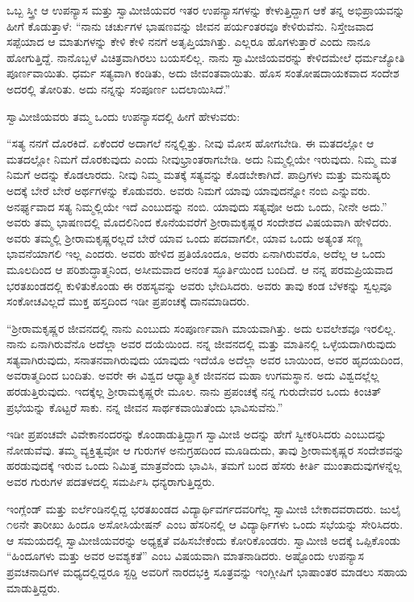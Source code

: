  ಒಬ್ಬ ಸ್ತ್ರೀ ಆ ಉಪನ್ಯಾಸ ಮತ್ತು ಸ್ವಾಮೀಜಿಯವರ ಇತರ ಉಪನ್ಯಾಸಗಳನ್ನು ಕೇಳುತ್ತಿದ್ದಾಗ ಆಕೆ ತನ್ನ ಅಭಿಪ್ರಾಯವನ್ನು ಹೀಗೆ ಕೊಡುತ್ತಾಳೆ: “ನಾನು ಚರ್ಚುಗಳ ಭಾಷಣವನ್ನು ಜೀವನ ಪರ್ಯಂತರವೂ ಕೇಳಿರುವೆನು. ನಿಸ್ತೇಜವಾದ ಸಪ್ಪೆಯಾದ ಆ ಮಾತುಗಳನ್ನು ಕೇಳಿ ಕೇಳಿ ನನಗೆ ಅತೃಪ್ತಿಯಾಗಿತ್ತು. ಎಲ್ಲರೂ ಹೊಗಳುತ್ತಾರೆ ಎಂದು ನಾನೂ ಹೋಗುತ್ತಿದ್ದೆ. ನಾನೊಬ್ಬಳೆ ವಿಚಿತ್ರವಾಗಿರಲು ಬಯಸಲಿಲ್ಲ. ನಾನು ಸ್ವಾಮೀಜಿಯವರನ್ನು ಕೇಳಿದಮೇಲೆ ಧರ್ಮಜ್ಯೋತಿ ಪೂರ್ಣವಾಯಿತು. ಧರ್ಮ ಸತ್ಯವಾಗಿ ಕಂಡಿತು, ಅದು ಜೀವಂತವಾಯಿತು. ಹೊಸ ಸಂತೋಷದಾಯಕವಾದ ಸಂದೇಶ ಅದರಲ್ಲಿ ತೋರಿತು. ಅದು ನನ್ನನ್ನು ಸಂಪೂರ್ಣ ಬದಲಾಯಿಸಿದೆ.” 

 ಸ್ವಾಮೀಜಿಯವರು ತಮ್ಮ ಒಂದು ಉಪನ್ಯಾಸದಲ್ಲಿ ಹೀಗೆ ಹೇಳುವರು: 

 “ಸತ್ಯ ನನಗೆ ದೊರಕಿದೆ. ಏಕೆಂದರೆ ಅದಾಗಲೆ ನನ್ನಲ್ಲಿತ್ತು. ನೀವು ಮೋಸ ಹೋಗಬೇಡಿ. ಈ ಮತದಲ್ಲೋ ಆ ಮತದಲ್ಲೋ ನಿಮಗೆ ದೊರಕುವುದು ಎಂದು ನೀವು\break ಭ್ರಾಂತರಾಗಬೇಡಿ. ಅದು ನಿಮ್ಮಲ್ಲಿಯೇ ಇರುವುದು. ನಿಮ್ಮ ಮತ ನಿಮಗೆ ಅದನ್ನು ಕೊಡಲಾರದು. ನೀವು ನಿಮ್ಮ ಮತಕ್ಕೆ ಸತ್ಯವನ್ನು ಕೊಡಬೇಕಾಗಿದೆ. ಪಾದ್ರಿಗಳು ಮತ್ತು ಮನುಷ್ಯರು ಅದಕ್ಕೆ ಬೇರೆ ಬೇರೆ ಅರ್ಥಗಳನ್ನು ಕೊಡುವರು. ಅವರು ನಿಮಗೆ ಯಾವು ಯಾವುದನ್ನೋ ನಂಬಿ ಎನ್ನುವರು. ಅನರ್ಘ್ಯವಾದ ಸತ್ಯ ನಿಮ್ಮಲ್ಲಿಯೇ ಇದೆ ಎಂಬುದನ್ನು ನಂಬಿ. ಯಾವುದು ಸತ್ಯವೋ ಅದು ಒಂದು, ನೀನೇ ಅದು.” ಅವರು ತಮ್ಮ ಭಾಷಣದಲ್ಲಿ ಮೊದಲಿನಿಂದ ಕೊನೆಯವರೆಗೆ ಶ‍್ರೀರಾಮಕೃಷ್ಣರ ಸಂದೇಶದ ವಿಷಯವಾಗಿ ಹೇಳಿದರು. ಅವರು ತಮ್ಮಲ್ಲಿ ಶ‍್ರೀರಾಮಕೃಷ್ಣರಲ್ಲದೆ ಬೇರೆ ಯಾವ ಒಂದು ಪದವಾಗಲೀ, ಯಾವ ಒಂದು ಅತ್ಯಂತ ಸಣ್ಣ ಭಾವನೆಯಾಗಲಿ ಇಲ್ಲ ಎಂದರು. ಅವರು ಹೇಳಿದ ಪ್ರತಿಯೊಂದೂ, ಅವರು ಏನಾಗಿರುವರೊ, ಅದೆಲ್ಲ ಆ ಒಂದು ಮೂಲದಿಂದ ಆ ಪರಿಶುದ್ಧಾತ್ಮನಿಂದ, ಅಸೀಮವಾದ ಅನಂತ ಸ್ಫೂರ್ತಿಯಿಂದ ಬಂದಿದೆ. ಆ ನನ್ನ ಪರಮಪ್ರಿಯವಾದ ಭರತಖಂಡದಲ್ಲಿ ಕುಳಿತುಕೊಂಡು ಈ ರಹಸ್ಯವನ್ನು ಅವರು ಭೇದಿಸಿದರು. ಅವರು ತಾವು ಕಂಡ ಬೆಳಕನ್ನು ಸ್ವಲ್ಪವೂ ಸಂಕೋಚವಿಲ್ಲದೆ ಮುಕ್ತ ಹಸ್ತದಿಂದ ಇಡೀ ಪ್ರಪಂಚಕ್ಕೆ ದಾನ\break ಮಾಡಿದರು. 

\vskip 3pt

 “ಶ‍್ರೀರಾಮಕೃಷ್ಣರ ಜೀವನದಲ್ಲಿ ನಾನು ಎಂಬುದು ಸಂಪೂರ್ಣವಾಗಿ ಮಾಯವಾಗಿತ್ತು. ಅದು ಲವಲೇಶವೂ ಇರಲಿಲ್ಲ. ನಾನು ಏನಾಗಿರುವೆನೊ ಅದೆಲ್ಲಾ ಅವರ ದಯೆಯಿಂದ. ನನ್ನ ಜೀವನದಲ್ಲಿ ಮತ್ತು ಮಾತಿನಲ್ಲಿ ಒಳ್ಳೆಯದಾಗಿರುವುದು ಸತ್ಯವಾಗಿರುವುದು, ಸನಾತನವಾಗಿರುವುದು ಯಾವುದು ಇದೆಯೊ ಅದೆಲ್ಲಾ ಅವರ ಬಾಯಿಂದ, ಅವರ ಹೃದಯದಿಂದ, ಅವರಾತ್ಮದಿಂದ ಬಂದಿತು. ಅವರೇ ಈ ವಿಶ್ವದ ಆಧ್ಯಾತ್ಮಿಕ ಜೀವನದ ಮಹಾ ಉಗಮಸ್ಥಾನ. ಅದು ವಿಶ್ವದಲ್ಲೆಲ್ಲ ಹರಡುತ್ತಿರುವುದು. ಇದಕ್ಕೆಲ್ಲ ಶ‍್ರೀರಾಮಕೃಷ್ಣರೇ ಮೂಲ. ನಾನು ಪ್ರಪಂಚಕ್ಕೆ ನನ್ನ ಗುರುದೇವರ ಒಂದು ಕಿಂಚಿತ್ ಪ್ರಭೆಯನ್ನು ಕೊಟ್ಟರೆ ಸಾಕು. ನನ್ನ ಜೀವನ ಸಾರ್ಥಕವಾಯಿತೆಂದು ಭಾವಿಸುವೆನು.” 

\newpage

 ಇಡೀ ಪ್ರಪಂಚವೇ ವಿವೇಕಾನಂದರನ್ನು ಕೊಂಡಾಡುತ್ತಿದ್ದಾಗ ಸ್ವಾಮೀಜಿ ಅದನ್ನು ಹೇಗೆ ಸ್ವೀಕರಿಸಿದರು ಎಂಬುದನ್ನು ನೋಡುವೆವು. ತಮ್ಮ ವ್ಯಕ್ತಿತ್ವವೋ ಆ ಗುರುಗಳ ಅನುಗ್ರಹದಿಂದ ಮೂಡಿದುದು, ತಾವು ಶ‍್ರೀರಾಮಕೃಷ್ಣರ ಸಂದೇಶವನ್ನು ಹರಡುವುದಕ್ಕೆ ಇರುವ ಒಂದು ನಿಮಿತ್ತ ಮಾತ್ರವೆಂದು ಭಾವಿಸಿ, ತಮಗೆ ಬಂದ ಹೆಸರು ಕೀರ್ತಿ ಮುಂತಾದುವುಗಳನ್ನೆಲ್ಲ ಅವರ ಗುರುಗಳ ಪದತಳದಲ್ಲಿ ಸಮರ್ಪಿಸಿ ಧನ್ಯರಾಗುತ್ತಿದ್ದರು. 

\vskip 3pt

 ಇಂಗ್ಲೆಂಡ್ ಮತ್ತು ಐರ್ಲೆಂಡಿನಲ್ಲಿದ್ದ ಭರತಖಂಡದ ವಿದ್ಯಾರ್ಥಿವರ್ಗದವರಿಗೆಲ್ಲ ಸ್ವಾಮೀಜಿ ಬೇಕಾದವರಾದರು. ಜುಲೈ ೧೮ನೇ ತಾರೀಖು ಹಿಂದೂ ಅಸೋಸಿಯೇಷನ್ ಎಂಬ ಹೆಸರಿನಲ್ಲಿ ಆ ವಿದ್ಯಾರ್ಥಿಗಳು ಒಂದು ಸಭೆಯನ್ನು ಸೇರಿಸಿದರು. ಆ ಸಮಯದಲ್ಲಿ ಸ್ವಾಮೀಜಿಯವರನ್ನು ಅಧ್ಯಕ್ಷತೆ ವಹಿಸಬೇಕೆಂದು ಕೋರಿಕೊಂಡರು. ಸ್ವಾಮೀಜಿ ಅದಕ್ಕೆ ಒಪ್ಪಿಕೊಂಡು “ಹಿಂದೂಗಳು ಮತ್ತು ಅವರ ಅವಶ್ಯಕತೆ” ಎಂಬ ವಿಷಯವಾಗಿ ಮಾತನಾಡಿದರು. ಅಷ್ಟೊಂದು ಉಪನ್ಯಾಸ ಪ್ರವಚನಾದಿಗಳ ಮಧ್ಯದಲ್ಲಿದ್ದರೂ ಸ್ಟರ‍್ಡಿ ಅವರಿಗೆ ನಾರದಭಕ್ತಿ ಸೂತ್ರವನ್ನು ಇಂಗ್ಲೀಷಿಗೆ ಭಾಷಾಂತರ ಮಾಡಲು ಸಹಾಯ ಮಾಡುತ್ತಿದ್ದರು. 

